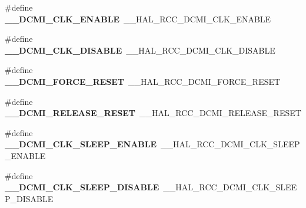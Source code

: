 \begin{DoxyCompactItemize}
\item 
\#define {\bfseries \+\_\+\+\_\+\+D\+C\+M\+I\+\_\+\+C\+L\+K\+\_\+\+E\+N\+A\+B\+LE}~\+\_\+\+\_\+\+H\+A\+L\+\_\+\+R\+C\+C\+\_\+\+D\+C\+M\+I\+\_\+\+C\+L\+K\+\_\+\+E\+N\+A\+B\+LE\hypertarget{group___h_a_l___r_c_c___aliased_ga5d0a441280f3b8efaa24cb93242dcc3a}{}\label{group___h_a_l___r_c_c___aliased_ga5d0a441280f3b8efaa24cb93242dcc3a}

\item 
\#define {\bfseries \+\_\+\+\_\+\+D\+C\+M\+I\+\_\+\+C\+L\+K\+\_\+\+D\+I\+S\+A\+B\+LE}~\+\_\+\+\_\+\+H\+A\+L\+\_\+\+R\+C\+C\+\_\+\+D\+C\+M\+I\+\_\+\+C\+L\+K\+\_\+\+D\+I\+S\+A\+B\+LE\hypertarget{group___h_a_l___r_c_c___aliased_gacfebd1d5cc89592b9313e683e9a6c00a}{}\label{group___h_a_l___r_c_c___aliased_gacfebd1d5cc89592b9313e683e9a6c00a}

\item 
\#define {\bfseries \+\_\+\+\_\+\+D\+C\+M\+I\+\_\+\+F\+O\+R\+C\+E\+\_\+\+R\+E\+S\+ET}~\+\_\+\+\_\+\+H\+A\+L\+\_\+\+R\+C\+C\+\_\+\+D\+C\+M\+I\+\_\+\+F\+O\+R\+C\+E\+\_\+\+R\+E\+S\+ET\hypertarget{group___h_a_l___r_c_c___aliased_ga083e8a8aedb1087763c550f8e1fb55c3}{}\label{group___h_a_l___r_c_c___aliased_ga083e8a8aedb1087763c550f8e1fb55c3}

\item 
\#define {\bfseries \+\_\+\+\_\+\+D\+C\+M\+I\+\_\+\+R\+E\+L\+E\+A\+S\+E\+\_\+\+R\+E\+S\+ET}~\+\_\+\+\_\+\+H\+A\+L\+\_\+\+R\+C\+C\+\_\+\+D\+C\+M\+I\+\_\+\+R\+E\+L\+E\+A\+S\+E\+\_\+\+R\+E\+S\+ET\hypertarget{group___h_a_l___r_c_c___aliased_ga6b90a9b7940aa1bd160945c302c5bb09}{}\label{group___h_a_l___r_c_c___aliased_ga6b90a9b7940aa1bd160945c302c5bb09}

\item 
\#define {\bfseries \+\_\+\+\_\+\+D\+C\+M\+I\+\_\+\+C\+L\+K\+\_\+\+S\+L\+E\+E\+P\+\_\+\+E\+N\+A\+B\+LE}~\+\_\+\+\_\+\+H\+A\+L\+\_\+\+R\+C\+C\+\_\+\+D\+C\+M\+I\+\_\+\+C\+L\+K\+\_\+\+S\+L\+E\+E\+P\+\_\+\+E\+N\+A\+B\+LE\hypertarget{group___h_a_l___r_c_c___aliased_gaecedc3114ebbd77adfa55b4bbc2d8b57}{}\label{group___h_a_l___r_c_c___aliased_gaecedc3114ebbd77adfa55b4bbc2d8b57}

\item 
\#define {\bfseries \+\_\+\+\_\+\+D\+C\+M\+I\+\_\+\+C\+L\+K\+\_\+\+S\+L\+E\+E\+P\+\_\+\+D\+I\+S\+A\+B\+LE}~\+\_\+\+\_\+\+H\+A\+L\+\_\+\+R\+C\+C\+\_\+\+D\+C\+M\+I\+\_\+\+C\+L\+K\+\_\+\+S\+L\+E\+E\+P\+\_\+\+D\+I\+S\+A\+B\+LE\hypertarget{group___h_a_l___r_c_c___aliased_gac8a3efddee5662625e8e6600dd1ecbee}{}\label{group___h_a_l___r_c_c___aliased_gac8a3efddee5662625e8e6600dd1ecbee}


\end{DoxyCompactItemize}
